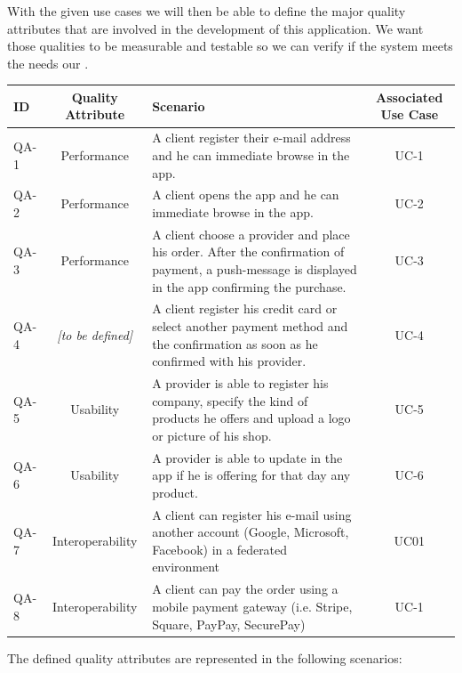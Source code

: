 With the given use cases we will then be able to define the major quality attributes that are involved in the 
development of this application. We want those qualities to be measurable and testable so we can verify if the 
system meets the needs our  \cite{refbook:DSHC}.

\begin{table}[H]
    \begin{tabularx}{\textwidth}{lcXc}
        \toprule
        ID & Quality Attribute & Scenario & Associated Use Case  \\
        \midrule
        QA-1 & Performance & A \gls{client} register their e-mail address and he can immediate browse in the app. & UC-1 \\
        QA-2 & Performance & A \gls{client} opens the app and he can immediate browse in the app. & UC-2 \\
        QA-3 & Performance & A \gls{client} choose a \gls{provider} and place his order. After the confirmation
        of payment, a push-message is displayed in the app confirming the purchase. & UC-3 \\
        QA-4 & \textit{[to be defined]} & A \gls{client}  register his credit card or select another payment method and the
        confirmation as soon as he confirmed with his \gls{provider}. & UC-4 \\
        QA-5 & Usability & A \gls{provider} is able to register his company, specify the kind of products he offers and upload
        a logo or picture of his shop. & UC-5 \\
        QA-6 & Usability & A \gls{provider} is able to update in the app if he is offering for that day any product. &  UC-6 \\
        QA-7 & Interoperability & A \gls{client} can register his e-mail using another account (Google, Microsoft, Facebook)
        in a federated environment & UC01 \\
        QA-8 & Interoperability & A \gls{client} can pay the order using a \gls{mobile payment gateway} (i.e. Stripe, Square, PayPay, 
        SecurePay) & UC-1 \\
        \bottomrule
    \end{tabularx}
\end{table}

\newpage
The defined quality attributes are represented in the following scenarios:


